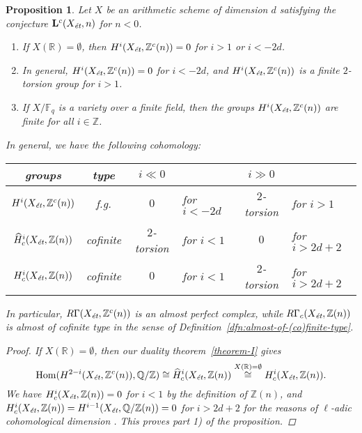 \documentclass[leqno,12pt]{article}
\theoremstyle{plain}
\newtheorem{proposition}[theorem]{\indent\sc Proposition}
\theoremstyle{definition}
\DeclareMathOperator{\Hom}{Hom}
\newcommand{\ZZ}{\mathbb{Z}}
\newcommand{\QQ}{\mathbb{Q}}
\newcommand{\RR}{\mathbb{R}}
\newcommand{\FF}{\mathbb{F}}
\newcommand{\et}{\text{\it \'{e}t}}
\begin{document}
\begin{proposition}
  \label{prop:motivic-cohomology-duality-consequences}
  Let $X$ be an arithmetic scheme of dimension $d$ satisfying the conjecture
  $\mathbf{L}^c (X_\et,n)$ for $n < 0$.

  \begin{enumerate}
  \item[$1)$] If $X (\RR) = \emptyset$, then $H^i (X_\et, \ZZ^c (n)) = 0$ for
    $i > 1$ or $i < -2d$.

  \item[$2)$] In general, $H^i (X_\et, \ZZ^c (n)) = 0$ for $i < -2d$, and
    $H^i (X_\et, \ZZ^c (n))$ is a finite $2$-torsion group for $i > 1$.

  \item[$3)$] If $X/\FF_q$ is a variety over a finite field, then the groups
    $H^i (X_\et, \ZZ^c(n))$ are finite for all $i \in \ZZ$.
  \end{enumerate}

  In general, we have the following cohomology:
  \begin{center}
    \renewcommand{\arraystretch}{1.5}
    \begin{tabular}{ccclcl}
      \hline
      \textbf{groups} & \textbf{type} & $i \ll 0$ & & $i \gg 0$ \\
      \hline
      $H^i (X_\et, \ZZ^c (n))$ & f.g. & $0$ & for $i < -2d$ & $2$-torsion & for $i > 1$ \\
      $\widehat{H}^i_c (X_\et, \ZZ (n))$ & cofinite & $2$-torsion & for $i < 1$ & $0$ & for $i > 2d + 2$ \\
      $H^i_c (X_\et, \ZZ (n))$ & cofinite & $0$ & for $i < 1$ & $2$-torsion & for $i > 2d + 2$ \\
      \hline
    \end{tabular}
  \end{center}
  In particular, $R\Gamma (X_\et, \ZZ^c (n))$ is an almost perfect complex,
  while $R\Gamma_c (X_\et, \ZZ (n))$ is almost of cofinite type in the sense of
  Definition~\ref{dfn:almost-of-(co)finite-type}.

  \begin{proof}
    If $X (\RR) = \emptyset$, then our duality theorem~\ref{theorem-I} gives
    \[ \Hom (H^{2-i} (X_\et, \ZZ^c (n)), \QQ/\ZZ) \cong
      \widehat{H}^i_c (X_\et, \ZZ (n)) \stackrel{X(\RR)=\emptyset}{\cong}
      H^i_c (X_\et, \ZZ (n)). \]
    We have $H^i_c (X_\et, \ZZ (n)) = 0$ for $i < 1$ by the definition of
    $\ZZ (n)$, and $H^i_c (X_\et, \ZZ (n)) = H^{i-1} (X_\et, \QQ/\ZZ(n)) = 0$
    for $i > 2d + 2$ for the reasons of $\ell$-adic cohomological dimension
    \cite[Expos\'{e}~X, Th\'{e}or\`{e}me~6.2]{SGA4}. This proves part 1) of the proposition.


\end{proof}
\end{proposition}
\end{document}
